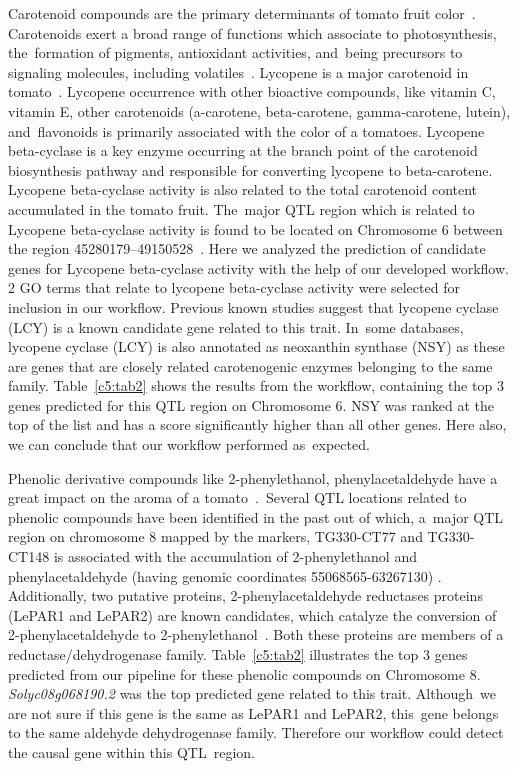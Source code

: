 \documentclass[applsci,article,accept,moreauthors,pdftex]{Definitions/mdpi}
\begin{document}
{Carotenoid compounds are the primary determinants of tomato fruit color~\cite{marti2016tomato}. Carotenoids exert a broad range of functions which associate to photosynthesis, the~formation of pigments, antioxidant activities, and~being precursors to signaling molecules, including volatiles~\cite{giuliano2014plant}. Lycopene is a major carotenoid in tomato~\cite{shi2004antioxidative}. Lycopene occurrence with other bioactive compounds, like vitamin C, vitamin E, other carotenoids (a-carotene, beta-carotene, gamma-carotene, lutein), and~flavonoids is primarily associated with the color of a tomatoes. Lycopene beta-cyclase is a key enzyme occurring at the branch point of the carotenoid biosynthesis pathway and responsible for converting lycopene to beta-carotene. Lycopene beta-cyclase activity is also related to the total carotenoid content accumulated in the tomato fruit. The~major QTL region which is related to Lycopene beta-cyclase activity is found to be located on Chromosome 6 between the region 45280179--49150528~\cite{cunningham1996functional}. Here we analyzed the prediction of candidate genes for Lycopene beta-cyclase activity with the help of our developed workflow. 2 GO terms that relate to lycopene beta-cyclase activity were selected for inclusion in our workflow. Previous known studies suggest that lycopene cyclase (LCY) is a known candidate gene related to this trait. In~some databases, lycopene cyclase (LCY) is also annotated as neoxanthin synthase (NSY) as these are genes that are closely related carotenogenic enzymes belonging to the same family. Table~\ref{c5:tab2} shows the results from the workflow, containing the top 3 genes predicted for this QTL region on Chromosome 6. NSY was ranked at the top of the list and has a score significantly higher than all other genes. Here also, we can conclude that our workflow performed as~expected. 

Phenolic derivative compounds like  2-phenylethanol, phenylacetaldehyde have a great impact on the aroma of a tomato~\cite{tadmor2002identification}.~Several QTL locations related to phenolic compounds have been identified in the past out of which, a~major QTL region on chromosome 8 mapped by the markers, TG330-CT77 and TG330-CT148 is associated with the accumulation of 2-phenylethanol and phenylacetaldehyde (having genomic coordinates 55068565-63267130) \cite{rousseaux2005qtl}. Additionally, two putative proteins, 2-phenylacetaldehyde reductases proteins (LePAR1 and LePAR2) are known candidates, which catalyze the conversion of 2-phenylacetaldehyde to 2-phenylethanol~\cite{tieman2007tomato}. Both these proteins are members of a reductase/dehydrogenase family. Table~\ref{c5:tab2} illustrates the top 3 genes predicted from our pipeline for these phenolic compounds on Chromosome 8. \textit{Solyc08g068190.2} was the top predicted gene related to this trait. Although~we are not sure if this gene is the same as LePAR1 and LePAR2, this~gene belongs to the same aldehyde dehydrogenase family. Therefore our workflow could detect the causal gene within this QTL~region. 

}
\end{document}
